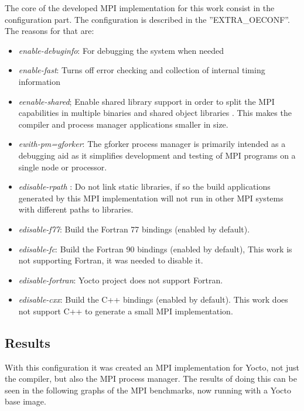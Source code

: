 The core of the developed MPI implementation for this work consist in the
configuration part. The configuration is described in the ''EXTRA\_OECONF''. 
The reasons for that are: 

\begin{itemize}
\item \textit{enable-debuginfo}: For debugging the system when needed
\item \textit{enable-fast}: Turns off error checking and collection of internal timing
information
\item \textit{eenable-shared}; Enable shared library support in order to split the MPI
capabilities in multiple binaries and shared object libraries . This makes the
compiler and process manager applications smaller in size.
\item \textit{ewith-pm=gforker}: The gforker process manager is primarily intended as a
debugging aid as it simplifies development and testing of MPI programs on a
single node or processor.
\item \textit{edisable-rpath} : Do not link static libraries, if so the build
applications generated by this MPI implementation will not run in other MPI
systems with different paths to libraries.
\item \textit{edisable-f77}: Build the Fortran 77 bindings (enabled by default).
\item \textit{edisable-fc}: Build the Fortran 90 bindings (enabled by default),
This work is not supporting Fortran, it was needed to disable it.
\item \textit{edisable-fortran}: Yocto project does not support Fortran.
\item \textit{edisable-cxx}: Build the C++ bindings (enabled by default). This
work does not support C++ to generate a small MPI implementation.
\end{itemize}


\subsection{Results}

With this configuration it was created an MPI implementation for Yocto, 
not just the compiler, but also the MPI process manager. The results of
doing this can be seen in the following graphs of the MPI benchmarks, now
running with a Yocto base image.

